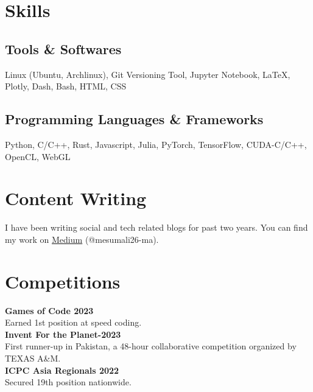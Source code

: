\documentclass[]{resume}
\begin{document}
\begin{minipage}[t]{0.5\textwidth}


    \section{Skills}

    \subsection{Tools \& Softwares}
    Linux (Ubuntu, Archlinux), Git Versioning Tool, Jupyter Notebook, \LaTeX, Plotly, Dash, Bash, HTML, CSS

    \subsection{Programming Languages \& Frameworks}
    Python, C/C++, Rust, Javascript, Julia, PyTorch, TensorFlow, CUDA-C/C++, OpenCL, WebGL


    \section{Content Writing}
    I have been writing social and tech related blogs for past two years. You can find my work on \href{https://medium.com/@mesumali26-ma}{Medium} (@mesumali26-ma).

    \section{Competitions}
    \textbf{Games of Code 2023}\\
    Earned 1st position at speed coding.\\
    \textbf{Invent For the Planet-2023}\\
    First runner-up in Pakistan, a 48-hour collaborative competition organized by TEXAS A\&M.\\
    \textbf{ICPC Asia Regionals 2022}\\
    Secured 19th position nationwide.


\end{minipage}
\end{document}
